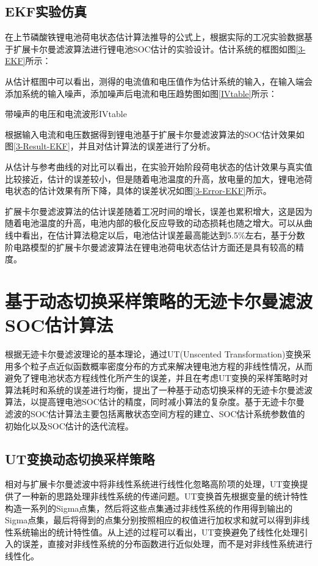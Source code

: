 \subsection{EKF实验仿真}
在上节磷酸铁锂电池荷电状态估计算法推导的公式上，根据实际的工况实验数据基于扩展卡尔曼滤波算法进行锂电池SOC估计的实验设计。估计系统的框图如图\ref{3-EKF}所示：

从估计框图中可以看出，测得的电流值和电压值作为估计系统的输入，在输入端会添加系统的输入噪声，添加噪声后电流和电压趋势图如图\ref{IVtable}所示：
\begin{pics}[htbp]{带噪声的电压和电流波形}{IVtable}
\end{pics}

根据输入电流和电压数据得到锂电池基于扩展卡尔曼滤波算法的SOC估计效果如图\ref{3-Result-EKF}，并且对估计算法的误差进行了分析。

从估计与参考曲线的对比可以看出，在实验开始阶段荷电状态的估计效果与真实值比较接近，估计的误差较小，但是随着电池温度的升高，放电量的加大，锂电池荷电状态的估计效果有所下降，具体的误差状况如图\ref{3-Error-EKF}所示。

扩展卡尔曼滤波算法的估计误差随着工况时间的增长，误差也累积增大，这是因为随着电池温度的升高，电池内部的极化反应导致的动态损耗也随之增大。可以从曲线中看出，在估计算法稳定以后，电池估计误差最高能达到5.5$\% $左右，基于分数阶电路模型的扩展卡尔曼滤波算法在锂电池荷电状态估计方面还是具有较高的精度。
\section{基于动态切换采样策略的无迹卡尔曼滤波SOC估计算法}
根据无迹卡尔曼滤波理论的基本理论，通过UT(Unscented Transformation)变换采用多个粒子点近似函数概率密度分布的方式来解决锂电池方程的非线性情况，从而避免了锂电池状态方程线性化所产生的误差，并且在考虑UT变换的采样策略时对算法耗时和系统的误差进行均衡，提出了一种基于动态切换采样的无迹卡尔曼滤波算法，以提高锂电池SOC估计的精度，同时减小算法的复杂度。基于无迹卡尔曼滤波的SOC估计算法主要包括离散状态空间方程的建立、SOC估计系统参数值的初始化以及SOC估计的迭代流程。
\subsection{UT变换动态切换采样策略}
相对与扩展卡尔曼滤波中将非线性系统进行线性化忽略高阶项的处理，UT变换提供了一种新的思路处理非线性系统的传递问题。UT变换首先根据变量的统计特性构造一系列的Sigma点集，然后将这些点集通过非线性系统的作用得到输出的Sigma点集，最后将得到的点集分别按照相应的权值进行加权求和就可以得到非线性系统输出的统计特性值。从上述的过程可以看出，UT变换避免了线性化处理引入的误差，直接对非线性系统的分布函数进行近似处理，而不是对非线性系统进行线性化。

